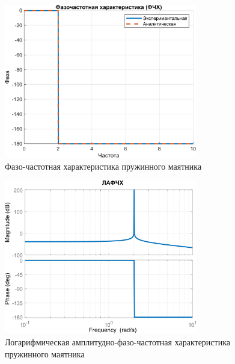 \begin{figure}[H]
    \centering
    \includegraphics[width=0.75\textwidth, trim={0cm 0cm 0cm 0cm}]{../images/4_4.png}
    \caption{Фазо-частотная характеристика пружинного маятника}
\end{figure}

\begin{figure}[H]
    \centering
    \includegraphics[width=0.75\textwidth, trim={0cm 0cm 0cm 0cm}]{../images/4_5.png}
    \caption{Логарифмическая амплитудно-фазо-частотная характеристика пружинного маятника}
\end{figure}
\endinput
